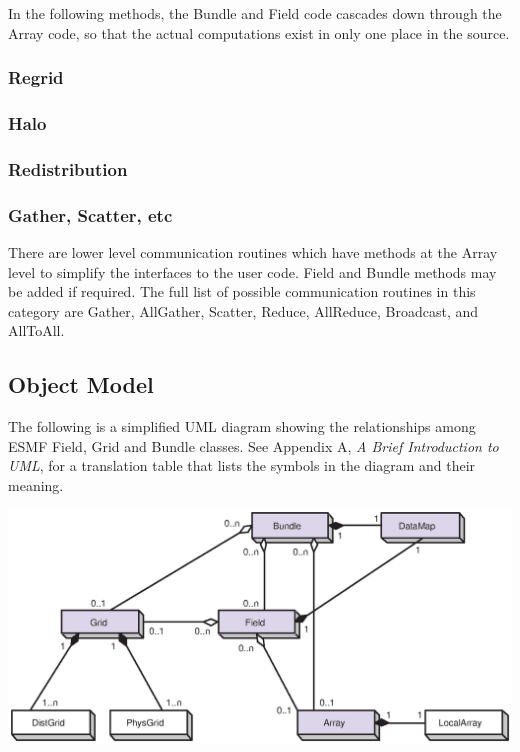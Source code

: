 In the following methods, the Bundle and Field code cascades down
through the Array code, so that the actual computations exist in
only one place in the source.

\subsubsection{Regrid}



\subsubsection{Halo}



\subsubsection{Redistribution}



\subsubsection{Gather, Scatter, etc}

There are lower level communication routines which have methods
at the Array level to simplify the interfaces to the user code.
Field and Bundle methods may be added if required.
The full list of possible communication routines in this category
are Gather, AllGather, Scatter, Reduce,
AllReduce, Broadcast, and AllToAll.

\newpage
\subsection{Object Model}

The following is a simplified UML diagram showing the relationships among
ESMF Field, Grid and Bundle classes.  See Appendix A, {\it A Brief 
Introduction to UML},
for a translation table that lists the symbols in the diagram and their 
meaning.

\begin{center}
\includegraphics{Bundle_obj.eps}   
\end{center}

